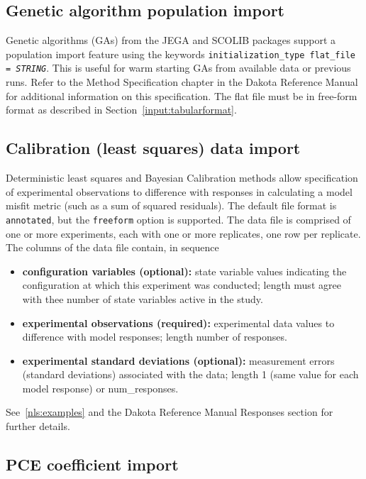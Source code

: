 \subsection{Genetic algorithm population import}

Genetic algorithms (GAs) from the JEGA and SCOLIB packages support a
population import feature using the keywords
\texttt{initialization\_type flat\_file = \emph{STRING}}.  This is
useful for warm starting GAs from available data or previous runs.
Refer to the Method Specification chapter in the Dakota Reference
Manual~\cite{RefMan} for additional information on this specification.
The flat file must be in free-form format as described in
Section~\ref{input:tabularformat}.

\subsection{Calibration (least squares) data import}

Deterministic least squares and Bayesian Calibration methods allow
specification of experimental observations to difference with
responses in calculating a model misfit metric (such as a sum of
squared residuals).  The default file format is {\tt annotated}, but
the {\tt freeform} option is supported.  The data file is comprised of
one or more experiments, each with one or more replicates, one row per
replicate.  The columns of the data file contain, in sequence
\begin{itemize}
\item {\bf configuration variables (optional):} state variable values
  indicating the configuration at which this experiment was conducted;
  length must agree with thee number of state variables active in the
  study.
\item {\bf experimental observations (required):} experimental data
  values to difference with model responses; length number of
  responses.
\item {\bf experimental standard deviations (optional):} measurement
  errors (standard deviations) associated with the data; length 1
  (same value for each model response) or num\_responses.
\end{itemize}
See~\ref{nls:examples} and the Dakota Reference Manual Responses
section for further details.

\subsection{PCE coefficient import}


